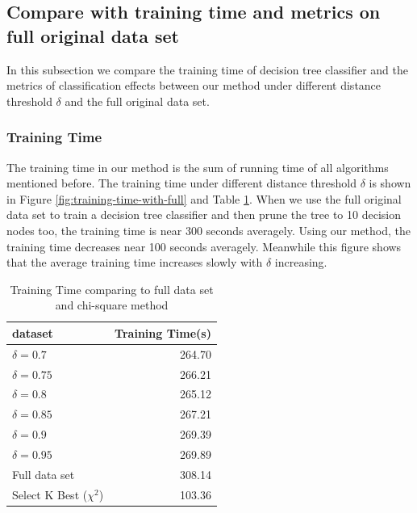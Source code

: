 \documentclass{ieeeaccess}
\theoremstyle{definition}
\begin{document}
\subsection{Compare with training time and metrics on full original data set}

In this subsection we compare the training time of decision tree classifier and the metrics of classification effects between our method under different distance threshold $\delta$ and the full original data set.

\subsubsection{Training Time}

The training time in our method is the sum of running time of all algorithms mentioned before. The training time under different distance threshold $\delta$ is shown in Figure \ref{fig:training-time-with-full} and Table \ref{tab:training-time-all}. 
When we use the full original data set to train a decision tree classifier and then prune the tree to 10 decision nodes too, the training time is near 300 seconds averagely. Using our method, the training time decreases near 100 seconds averagely.  
Meanwhile this figure shows that the average training time increases slowly with $\delta$ increasing.

\begin{table}[!htbp]
    \centering
    \caption{Training Time comparing to full data set and chi-square method}
    \label{tab:training-time-all}
    \begin{tabular}{lr}
        \toprule
        dataset & Training Time(s) \\
        \midrule
        $\delta=0.7$ & 264.70 \\
        $\delta=0.75$ & 266.21 \\
        $\delta=0.8$ & 265.12 \\
        $\delta=0.85$ &  267.21 \\
        $\delta=0.9$ &   269.39 \\
        $\delta=0.95$ & 269.89 \\
        Full data set & 308.14 \\
        Select K Best ($\chi^2$) & 103.36 \\
        \bottomrule
    \end{tabular}
\end{table}
\end{document}
